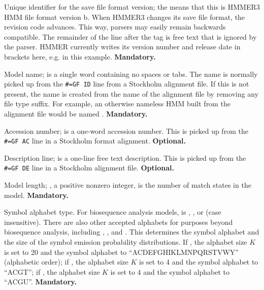 \begin{sreitems}{}

\item [\emprog{HMMER3/b}] Unique identifier for the save file format
  version; the  means that this is HMMER3 HMM file format
  version b. When HMMER3 changes its save file format, the revision
  code advances. This way, parsers may easily remain backwards
  compatible. The remainder of the line after the  tag
  is free text that is ignored by the parser. HMMER currently writes
  its version number and release date in brackets here,
  e.g. \prog{[3.0b2 | June 2009]} in this
  example. \textbf{Mandatory.}

\item [\emprog{NAME <s>}] Model name;  is a single word
containing no spaces or tabs. The name is normally picked up from the
\verb+#=GF ID+ line from a Stockholm alignment file.  If this is not
present, the name is created from the name of the alignment file by
removing any file type suffix. For example, an otherwise nameless HMM
built from the alignment file  would be named
.  \textbf{Mandatory.}

\item [\emprog{ACC <s>}] Accession number;  is a one-word
accession number. This is picked up from the \verb+#=GF AC+ line in a
Stockholm format alignment. \textbf{Optional.}

\item [\emprog{DESC <s>}] Description line;  is a one-line
free text description. This is picked up from the \verb+#=GF DE+ line
in a Stockholm alignment file. \textbf{Optional.}

\item [\emprog{LENG <d>}] Model length; , a positive nonzero
integer, is the number of match states in the model.
\textbf{Mandatory.}

\item [\emprog{ALPH <s>}] Symbol alphabet type. For biosequence
analysis models,  is , , or 
(case insensitive). There are also other accepted alphabets for
purposes beyond biosequence analysis, including ,
, and . This determines the symbol alphabet
and the size of the symbol emission probability distributions.  If
, the alphabet size $K$ is set to 20 and the symbol
alphabet to ``ACDEFGHIKLMNPQRSTVWY'' (alphabetic order); if
, the alphabet size $K$ is set to 4 and the symbol alphabet
to ``ACGT''; if , the alphabet size $K$ is set to 4 and the
symbol alphabet to ``ACGU''. \textbf{Mandatory.}


\end{sreitems}

